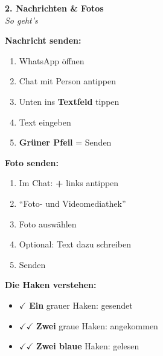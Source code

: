 \documentclass[a4paper,landscape,8pt]{extarticle}
\begin{document}
\hfill%
\begin{minipage}[t]{0.32\linewidth}
\begin{center}
\colorbox{chatblue!10}{%
\begin{minipage}{0.95\linewidth}
\vspace{2mm}
\begin{center}
{\Large\bfseries\textcolor{chatblue}{2. Nachrichten \& Fotos}}\\[1pt]
{\footnotesize\itshape So geht's}
\end{center}
\vspace{2mm}
\end{minipage}%
}
\end{center}

\vspace{1mm}

\textbf{Nachricht senden:}
\begin{enumerate}
\item WhatsApp öffnen
\item Chat mit Person antippen
\item Unten ins \textbf{Textfeld} tippen
\item Text eingeben
\item \textbf{Grüner Pfeil} = Senden
\end{enumerate}

\textbf{Foto senden:}
\begin{enumerate}
\item Im Chat: \textbf{+} links antippen
\item ``Foto- und Videomediathek''
\item Foto auswählen
\item Optional: Text dazu schreiben
\item Senden
\end{enumerate}

\textbf{Die Haken verstehen:}
\begin{itemize}
\item $\checkmark$ \textbf{Ein} grauer Haken: gesendet
\item $\checkmark\checkmark$ \textbf{Zwei} graue Haken: angekommen
\item \textcolor{chatblue}{$\checkmark\checkmark$} \textbf{Zwei blaue} Haken: gelesen
\end{itemize}

\end{minipage}%
\hfill%
\end{document}
